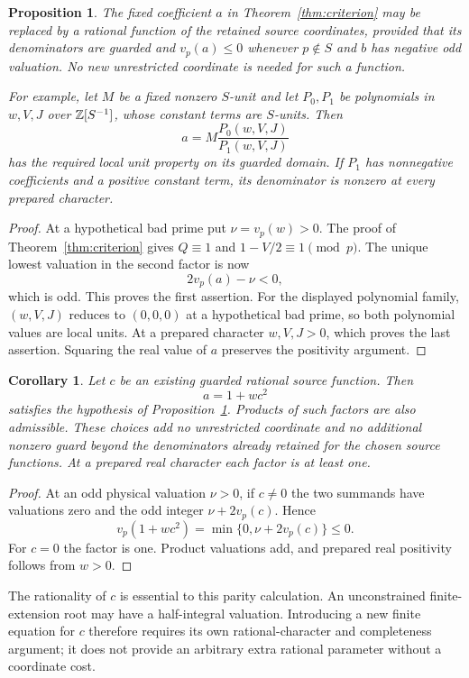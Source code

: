\documentclass[11pt,a4paper]{article}
\newtheorem{proposition}[theorem]{Proposition}
\newtheorem{corollary}[theorem]{Corollary}
\begin{document}
\begin{proposition}\label{prop:adaptive}
The fixed coefficient $a$ in Theorem~\ref{thm:criterion} may be replaced
by a rational function of the retained source coordinates, provided
that its denominators are guarded and $v_p(a)\le0$ whenever
$p\notin S$ and $b$ has negative odd valuation. No new unrestricted
coordinate is needed for such a function.

For example, let $M$ be a fixed nonzero $S$-unit and let $P_0,P_1$
be polynomials in $w,V,J$ over $\mathbb Z[S^{-1}]$, whose constant terms
are $S$-units. Then
\[
                    a=M\frac{P_0(w,V,J)}{P_1(w,V,J)}
\]
has the required local unit property on its guarded domain.
If $P_1$ has nonnegative coefficients and a positive constant term,
its denominator is nonzero at every prepared character.
\end{proposition}
\begin{proof}
At a hypothetical bad prime put $\nu=v_p(w)>0$. The proof of
Theorem~\ref{thm:criterion} gives $Q\equiv1$ and
$1-V/2\equiv1\pmod p$. The unique lowest valuation in the second
factor is now
\[
                         2v_p(a)-\nu<0,
\]
which is odd. This proves the first assertion. For the displayed
polynomial family, $(w,V,J)$ reduces to $(0,0,0)$ at a hypothetical
bad prime, so both polynomial values are local units. At a prepared
character $w,V,J>0$, which proves the last assertion. Squaring the
real value of $a$ preserves the positivity argument.
\end{proof}

\begin{corollary}\label{cor:outer}
Let $c$ be an existing guarded rational source function. Then
\[
                              a=1+wc^2
\]
satisfies the hypothesis of Proposition~\ref{prop:adaptive}. Products
of such factors are also admissible. These choices add no unrestricted
coordinate and no additional nonzero guard beyond the denominators
already retained for the chosen source functions. At a prepared real
character each factor is at least one.
\end{corollary}
\begin{proof}
At an odd physical valuation $\nu>0$, if $c\ne0$ the two summands
have valuations zero and the odd integer $\nu+2v_p(c)$. Hence
\[
                    v_p(1+wc^2)=\min\{0,\nu+2v_p(c)\}\le0.
\]
For $c=0$ the factor is one. Product valuations add, and prepared
real positivity follows from $w>0$.
\end{proof}

The rationality of $c$ is essential to this parity calculation. An
unconstrained finite-extension root may have a half-integral valuation.
Introducing a new finite equation for $c$ therefore requires its own
rational-character and completeness argument; it does not provide an
arbitrary extra rational parameter without a coordinate cost.
\end{document}
